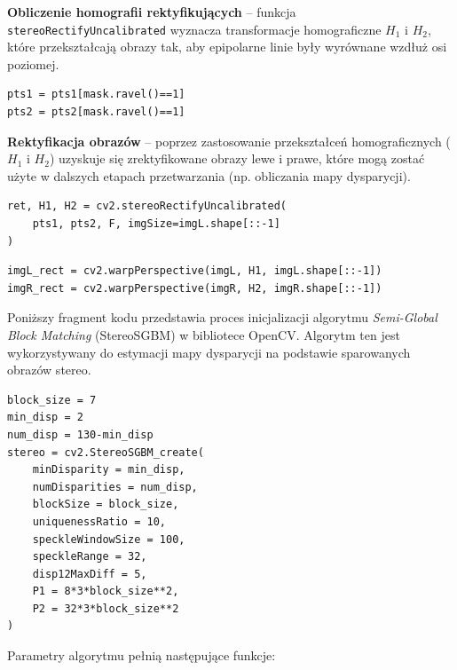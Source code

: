 \documentclass[magisterska]{pracadypl}
\begin{document}
\textbf{Obliczenie homografii rektyfikujących} – funkcja \texttt{stereoRectifyUncalibrated} wyznacza transformacje homograficzne $H_1$ i $H_2$, które przekształcają obrazy tak, aby epipolarne linie były wyrównane wzdłuż osi poziomej.

\begin{lstlisting}[style=mypython]
pts1 = pts1[mask.ravel()==1]
pts2 = pts2[mask.ravel()==1]
\end{lstlisting}

\textbf{Rektyfikacja obrazów} – poprzez zastosowanie przekształceń homograficznych ($H_1$ i $H_2$) uzyskuje się zrektyfikowane obrazy lewe i prawe, które mogą zostać użyte w dalszych etapach przetwarzania (np. obliczania mapy dysparycji).

\begin{lstlisting}[style=mypython]
ret, H1, H2 = cv2.stereoRectifyUncalibrated(
    pts1, pts2, F, imgSize=imgL.shape[::-1]
)
\end{lstlisting}

\begin{lstlisting}[style=mypython]
imgL_rect = cv2.warpPerspective(imgL, H1, imgL.shape[::-1])
imgR_rect = cv2.warpPerspective(imgR, H2, imgR.shape[::-1])
\end{lstlisting}

Poniższy fragment kodu przedstawia proces inicjalizacji algorytmu \textit{Semi-Global Block Matching} (StereoSGBM) w bibliotece OpenCV.  
Algorytm ten jest wykorzystywany do estymacji mapy dysparycji na podstawie sparowanych obrazów stereo.  

\begin{lstlisting}[style=mypython]
block_size = 7
min_disp = 2
num_disp = 130-min_disp
stereo = cv2.StereoSGBM_create(
    minDisparity = min_disp,
    numDisparities = num_disp,
    blockSize = block_size,
    uniquenessRatio = 10,
    speckleWindowSize = 100,
    speckleRange = 32,
    disp12MaxDiff = 5,
    P1 = 8*3*block_size**2,
    P2 = 32*3*block_size**2
)
\end{lstlisting}

Parametry algorytmu pełnią następujące funkcje:
\end{document}
